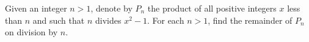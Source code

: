 Given an integer $n > 1$, denote by $P_n$ the product of all positive integers $x$ less than $n$ and such that $n$ divides $x^2 - 1$. For each $n > 1$, find the remainder of $P_n$ on division by $n$.
